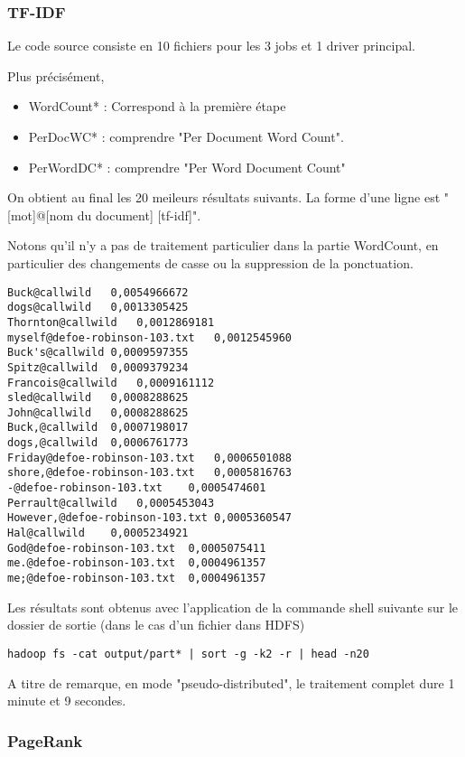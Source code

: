 \documentclass[french]{article}
\begin{document}
\subsubsection{TF-IDF}

Le code source consiste en 10 fichiers pour les 3 jobs et 1 driver principal.

Plus précisément,

\begin{itemize}
	\item WordCount* : Correspond à la première étape
	\item PerDocWC* : comprendre "Per Document Word Count".
	\item PerWordDC* : comprendre "Per Word Document Count"
\end{itemize}

On obtient au final les 20 meileurs résultats suivants. La forme d'une ligne est "[mot]@[nom du document]    [tf-idf]".

Notons qu'il n'y a pas de traitement particulier dans la partie WordCount, en particulier des changements de casse ou la suppression de la ponctuation.


\begin{verbatim}
Buck@callwild	0,0054966672
dogs@callwild	0,0013305425
Thornton@callwild	0,0012869181
myself@defoe-robinson-103.txt	0,0012545960
Buck's@callwild	0,0009597355
Spitz@callwild	0,0009379234
Francois@callwild	0,0009161112
sled@callwild	0,0008288625
John@callwild	0,0008288625
Buck,@callwild	0,0007198017
dogs,@callwild	0,0006761773
Friday@defoe-robinson-103.txt	0,0006501088
shore,@defoe-robinson-103.txt	0,0005816763
-@defoe-robinson-103.txt	0,0005474601
Perrault@callwild	0,0005453043
However,@defoe-robinson-103.txt	0,0005360547
Hal@callwild	0,0005234921
God@defoe-robinson-103.txt	0,0005075411
me.@defoe-robinson-103.txt	0,0004961357
me;@defoe-robinson-103.txt	0,0004961357
\end{verbatim}

Les résultats sont obtenus avec l'application de la commande shell suivante sur le dossier de sortie (dans le cas d'un fichier dans HDFS)

\begin{verbatim}
hadoop fs -cat output/part* | sort -g -k2 -r | head -n20
\end{verbatim}

A titre de remarque, en mode "pseudo-distributed", le traitement complet dure 1 minute et 9 secondes.

\subsubsection{PageRank}
\end{document}
